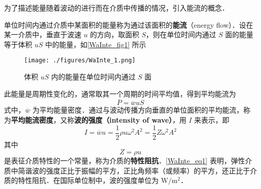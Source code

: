 
\begin{issues}
\end{issues}


为了描述能量随着波动的进行而在介质中传播的情况，引入能流的概念．

单位时间内通过介质中某面积的能量称为通过该面积的\textbf{能流}（energy flow）．设在某一介质中，垂直于波速 $u$ 的方向，取面积 $S$，则在单位时间内通过 $S$ 面的能量等于体积 $uS$ 中的能量，如\autoref{WaInte_fig1} 所示
\begin{figure}[ht]
\centering
\texttt{[image: ./figures/WaInte\_1.png]}
\caption{体积 $uS$ 内的能量在单位时间内通过 $S$ 面} \label{WaInte_fig1}
\end{figure}

此能量是周期性变化的，通常取其一个周期的时间平均值，得到平均能流为
\begin{equation}
\overline{P}=\overline{w} u S
\end{equation}
式中，$\overline w$ 为平均能量密度．通过与波动传播方向垂直的单位面积的平均能流，称为\textbf{平均能流密度}，又称\textbf{波的强度（intensity of wave）}，用 $I$ 来表示，即
\begin{equation} \label{WaInte_eq1}
I=\overline{w} u=\frac{1}{2} \rho u \omega^{2} A^{2}=\frac{1}{2} Z \omega^{2} A^{2}
\end{equation}
其中
\begin{equation}
Z=\rho u
\end{equation}
是表征介质特性的一个常量，称为介质的\textbf{特性阻抗}．\autoref{WaInte_eq1} 表明，弹性介质中简谐波的强度正比于振幅的平方，正比角频率（或频率）的平方，还正比于介质的特性阻抗．在国际单位制中，波的强度单位为 $\mathrm{W}/\mathrm{m^2}$．